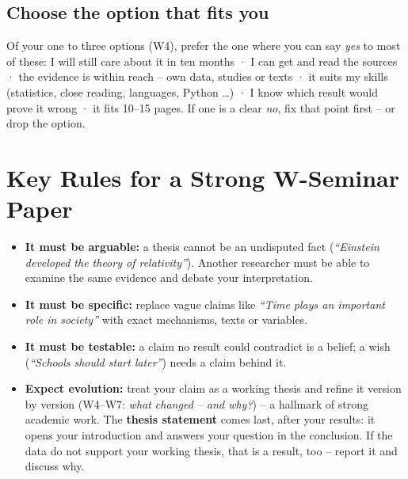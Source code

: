 \subsection{Choose the option that fits you}
Of your one to three options (W4), prefer the one where you can say \emph{yes} to most of these: I will still care about it in ten months · I can get and read the sources · the evidence is within reach – own data, studies or texts · it suits my skills (statistics, close reading, languages, Python …) · I know which result would prove it wrong · it fits 10–15 pages. If one is a clear \emph{no}, fix that point first – or drop the option.

\section{Key Rules for a Strong W-Seminar Paper}

\begin{itemize}[leftmargin=1.4em, itemsep=0.05em]
\item \textbf{It must be arguable:} a thesis cannot be an undisputed fact (\emph{“Einstein developed the theory of relativity”}). Another researcher must be able to examine the same evidence and debate your interpretation.
\item \textbf{It must be specific:} replace vague claims like \emph{“Time plays an important role in society”} with exact mechanisms, texts or variables.
\item \textbf{It must be testable:} a claim no result could contradict is a belief; a wish (\emph{“Schools should start later”}) needs a claim behind it.
\item \textbf{Expect evolution:} treat your claim as a working thesis and refine it version by version (W4–W7: \emph{what changed – and why?}) – a hallmark of strong academic work. The \textbf{thesis statement} comes last, after your results: it opens your introduction and answers your question in the conclusion. If the data do not support your working thesis, that is a result, too – report it and discuss why.
\end{itemize}

